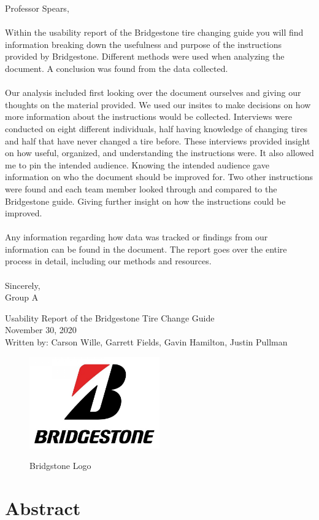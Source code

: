 \documentclass[12pt,A4paper]{article}
\begin{document}
	\noindent
	Professor Spears, \\ \\
	\noindent
	Within the usability report of the Bridgestone tire changing guide you will find information breaking down the usefulness and purpose of the instructions provided by Bridgestone. Different methods were used when analyzing the document. A conclusion was found from the data collected.\\ 
	\\Our analysis included first looking over the document ourselves and giving our thoughts on the material provided. We used our insites to make decisions on how more information about the instructions would be collected. Interviews were conducted on eight different individuals, half having knowledge of changing tires and half that have never changed a tire before. These interviews provided insight on how useful, organized, and understanding the instructions were. It also allowed me to pin the intended audience. Knowing the intended audience gave information on who the document should be improved for. Two other instructions were found and each team member looked through and compared to the Bridgestone guide. Giving further insight on how the instructions could be improved.\\ 
	\\Any information regarding how data was tracked or findings from our information can be found in the document. The report goes over the entire process in detail, including our methods and resources.\\ \\Sincerely,\\ Group A
	\thispagestyle{empty}
	\clearpage
	\thispagestyle{empty}
	\begin{center}
		\Huge
		Usability Report of the Bridgestone Tire Change Guide \\
		\vspace{0.25 in}
		\Large
		 November 30, 2020 \\
		 \vspace{0.25 in}
		Written by: Carson Wille, Garrett Fields, Gavin Hamilton, Justin Pullman
		\begin{figure}[!h]
			\centering
			\vspace{0.5 in}
			\includegraphics[width=0.5\textwidth]{logo.jpg}
			\label{fig:f1}
			\caption{Bridgstone Logo}
		\end{figure}
		\vspace*{\fill}
		\section{Abstract}
	\end{center}
\end{document}
